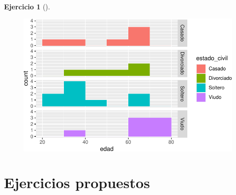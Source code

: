 \documentclass[
  a4paper,
]{scrreport}
\theoremstyle{definition}
\newtheorem{exercise}{Ejercicio}[chapter]
\theoremstyle{remark}
\begin{document}
\begin{exercise}[]
\begin{enumerate}
\begin{tcolorbox}
\begin{figure}[H]
  {\centering \includegraphics{03-frecuencias-graficos_files/figure-pdf/unnamed-chunk-35-1.pdf}

  }

  \end{figure}

  \end{tcolorbox}
\end{enumerate}

\end{exercise}

\hypertarget{ejercicios-propuestos-1}{%
\section{Ejercicios propuestos}\label{ejercicios-propuestos-1}}
\end{document}
